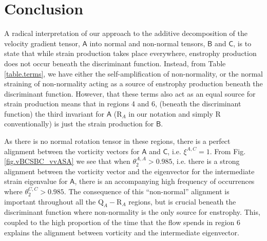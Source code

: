 \documentclass[preprint,amssymb,amsmath,aip,cha]{revtex4-1}
\begin{document}
\section{Conclusion}
A radical interpretation of our approach to the additive decomposition of the velocity gradient tensor, $\mathsf{A}$ into normal and non-normal tensors, $\mathsf{B}$ and $\mathsf{C}$, is to state that while strain production takes place everywhere, enstrophy production does not occur beneath the discriminant function. Instead, from Table \ref{table.terms}, we have either the self-amplification of non-normality, or the normal straining of non-normality acting as a source of enstrophy production beneath the discriminant function. However, that these terms also act as an equal source for strain production means that in regions 4 and 6, (beneath the discriminant function) the third invariant for $\mathsf{A}$ ($\mbox{R}_{A}$ in our notation and simply $\mbox{R}$ conventionally) is just the strain production for $\mathsf{B}$.

As there is no normal rotation tensor in these regions, there is a perfect alignment between the vorticity vectors for $\mathsf{A}$ and $\mathsf{C}$, i.e. $\xi^{A,C} = 1$. From Fig. \ref{fig.vBCSBC_vvASA} we see that when $\theta^{A,A}_{2} > 0.985$, i.e. there is a strong alignment between the vorticity vector and the eigenvector for the intermediate strain eigenvalue for $\mathsf{A}$, there is an accompanying high frequency of occurrences where $\theta^{C,C}_{2} > 0.985$. The consequence of this ``non-normal'' alignment is important throughout all the $\mbox{Q}_{A}-\mbox{R}_{A}$ regions, but is crucial beneath the discriminant function where non-normality is the only source for enstrophy. This, coupled to the high proportion of the time that the flow spends in region 6 explains the alignment between vorticity and the intermediate eigenvector.
\end{document}
